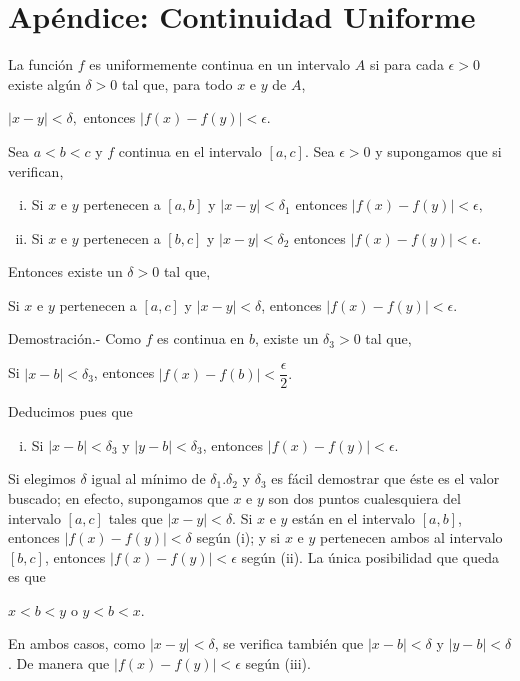 \begin{enumerate}[\bfseries 1.]
\begin{enumerate}[(a)]
	\end{enumerate}

\end{enumerate}

\section{Apéndice: Continuidad Uniforme}

    \begin{def.}
	La función $f$ es uniformemente continua en un intervalo $A$ si para cada $\epsilon>0$ existe algún $\delta>0$ tal que, para todo $x$ e $y$ de $A$,
	\begin{center}
	    $|x-y|<\delta,$ entonces $|f(x)-f(y)|<\epsilon.$
	\end{center}
    \end{def.}

\begin{lema}
    Sea $a<b<c$ y $f$ continua en el intervalo $[a,c]$. Sea $\epsilon>0$ y supongamos que si verifican,
    \begin{enumerate}[(i)]
	\item Si $x$ e $y$ pertenecen a $[a,b]$ y $|x-y|<\delta_1$ entonces $|f(x)-f(y)|<\epsilon,$
	\item Si $x$ e $y$ pertenecen a $[b,c]$ y $|x-y|<\delta_2$ entonces $|f(x)-f(y)|<\epsilon.$
    \end{enumerate}
    Entonces existe un $\delta>0$ tal que,
    \begin{center}
	Si $x$ e $y$ pertenecen a $[a,c]$ y $|x-y|<\delta$, entonces $|f(x)-f(y)|<\epsilon.$
    \end{center}
    \vspace{.7cm}
	Demostración.-\; Como $f$ es continua en $b$, existe un $\delta_3>0$ tal que,
	\begin{center}
	    Si $|x-b|<\delta_3$, entonces $|f(x)-f(b)|<\dfrac{\epsilon}{2}.$
	\end{center}
	Deducimos pues que
	\begin{enumerate}[iii)]
	    \item Si $|x-b|<\delta_3$ y $|y-b|<\delta_3$, entonces $|f(x)-f(y)|<\epsilon.$
	\end{enumerate}
	Si elegimos $\delta$ igual al mínimo de $\delta_1.\delta_2$ y $\delta_3$ es fácil demostrar que éste es el valor buscado; en efecto, supongamos que $x$ e $y$ son dos puntos cualesquiera del intervalo $[a,c]$ tales que $|x-y|<\delta$. Si $x$ e $y$ están en el intervalo $[a,b]$, entonces $|f(x)-f(y)|<\delta$ según (i); y si $x$ e $y$ pertenecen ambos al intervalo $[b,c]$, entonces $|f(x)-f(y)|<\epsilon$ según (ii). La única posibilidad que queda es que 
	\begin{center}
	    $x<b<y$ o $y<b<x.$
	\end{center}
	En ambos casos, como $|x-y|<\delta$, se verifica también que $|x-b|<\delta$ y $|y-b|<\delta$. De manera que $|f(x)-f(y)|<\epsilon$ según (iii).\\\\
\end{lema}

